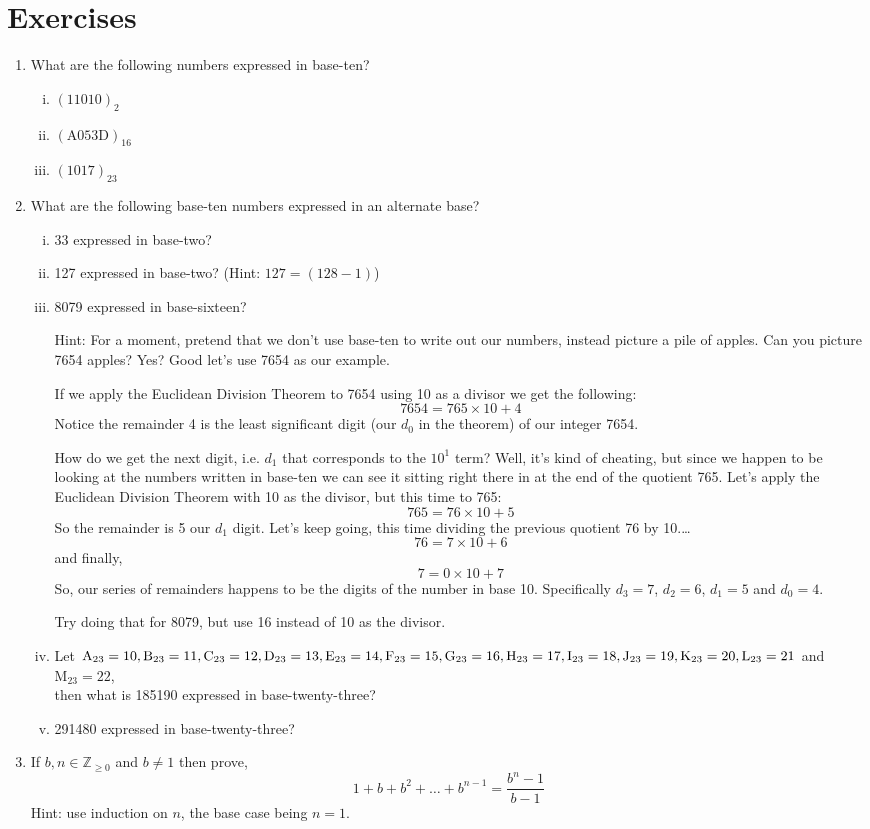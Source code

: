 \documentclass{article}
\begin{document}
\section*{Exercises}
\begin{enumerate}
\item What are the following numbers expressed in base-ten?
\begin{enumerate}[i)]
\item $(11010)_2$
\item $(\text{A}053\text{D})_{16}$
\item $(1017)_{23}$
\end{enumerate}
\item What are the following base-ten numbers expressed in an alternate base?
\begin{enumerate}[i)]
\item 33 expressed in base-two?
\item 127 expressed in base-two? (Hint: $127 = (128-1)$)
\item 8079 expressed in base-sixteen?

Hint: For a moment, pretend that we don't use base-ten to
write out our numbers, instead picture a pile of apples.
Can you picture 7654 apples?  Yes?  Good let's use 7654 as our example.

If we apply the Euclidean Division Theorem to 7654 using 10 as a divisor we get the following:
\[7654 = 765\times{}10+4\]
Notice the remainder 4 is the least significant digit (our $d_0$ in the theorem) of our
integer 7654.

How do we get the next digit, i.e. $d_1$ that corresponds to the $10^1$ term? Well, it’s kind of cheating, but
since we happen to be looking at the numbers written in
base-ten we can see it sitting right there in at the
end of the quotient 765. Let's apply the Euclidean Division Theorem with 10 as the divisor, but
this time to 765:
\[765 = 76\times{}10+5\]
So the remainder is 5 our $d_1$ digit.  Let's keep going, this time dividing the previous quotient 76 by 10.\dots	
\[76 = 7\times{}10+6\]
and finally,
\[7= 0\times{}10+7\]
So, our series of remainders happens to be the digits of the number in base 10.
Specifically $d_3 = 7$, $d_2=6$, $d_1=5$ and $d_0=4$.

Try doing that for 8079, but use 16 instead of 10 as the divisor.
\item Let $\text{A}_{23} = 10, \text{B}_{23} = 11, \text{C}_{23} = 12, \text{D}_{23} = 13, \text{E}_{23} = 14, \text{F}_{23} = 15,
\text{G}_{23} = 16,\\
\text{H}_{23} = 17, \text{I}_{23} = 18, \text{J}_{23} = 19, \text{K}_{23} = 20, \text{L}_{23} = 21$ and $\text{M}_{23} = 22$,\\
then what is 185190 expressed in base-twenty-three?
\item 291480 expressed in base-twenty-three?
\end{enumerate}
\item If $b, n \in \mathbb{Z}_{\ge 0}$ and $b\ne1$ then prove,
\[1+b+b^2+\dots+b^{n-1} = \frac{b^n-1}{b-1}\]
Hint: use induction on $n$, the base case being $n=1$.

\end{enumerate}
\end{document}
